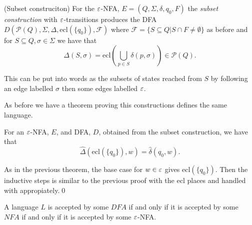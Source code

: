 \documentclass[tikx, border = 10pt]{article}
\begin{document}
\begin{definition}
	(Subset construciton) For the $ \varepsilon $-NFA, $ E = (Q,\Sigma, \delta, q_0, F) $ the \textit{subset construction} with $ \varepsilon $-transitions produces the DFA $ D(\mathcal P(Q), \Sigma, \Delta, \mathrm{ecl}(\{q_0\}),\mathcal F) $ where $ \mathcal F = \{ S\subseteq Q | S\cap F \ne \emptyset \} $ as before and for $ S\subseteq Q, \sigma \in \Sigma $ we have that
	\[
		\Delta(S,\sigma) = \mathrm{ecl}\left(\bigcup_{p\in S}\delta(p,\sigma)\right)\in \mathcal P(Q).
	\]
\end{definition}
\begin{remark}
  This can be put into words as the subsets of states reached from $ S $ by following an edge labelled $ \sigma $ then some edges labelled $ \varepsilon $. 
\end{remark}
As before we have a theorem proving this constructions defines the same language.
\begin{theorem}
  For an $ \varepsilon $-NFA, $ E $, and DFA, $ D $, obtained from the subset construction, we have that
  \[
	  \hat \Delta(\mathrm{ecl}(\{q_0\}), w) = \hat\delta(q_0,w).
  \]
\end{theorem}
\pf As in the previous theorem, the base case for $ w\in \varepsilon $ gives $ \mathrm{ecl}(\{q_0\}) $. Then the inductive steps is similar to the previous proof with the $ \mathrm{ecl} $ places and handled with appropiately.\qed 
\begin{corollary}
  A language $ L $ is accepted by some $ DFA $ if and only if it is accepted by some $ NFA $ if and only if it is accepted by some $ \varepsilon $-NFA.
\end{corollary}
\end{document}
